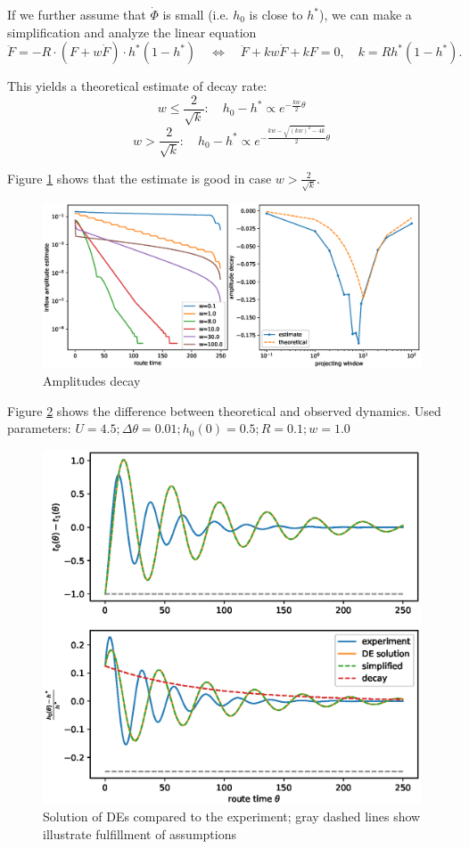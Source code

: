 \documentclass[12pt]{article}
\begin{document}
If we further assume that $\dot{\Phi}$ is small (i.e. $h_0$ is close to $h^*$), we can make a simplification and analyze the linear equation
$$ \ddot{F} = - R \cdot(F + w \dot{F}) \cdot  h^*(1-h^*) \quad \Leftrightarrow \quad \ddot{F} + kw\dot{F} + kF = 0 , \quad k = Rh^*(1-h^*).$$

This yields a theoretical estimate of decay rate:
$$ w \leq \frac{2}{\sqrt{k}}: \quad h_0 - h^* \propto e^{-\frac{kw}{2} \theta}$$ 
$$w > \frac{2}{\sqrt{k}}: \quad h_0 - h^* \propto e^{-\frac{kw - \sqrt{(kw)^2 - 4k}}{2}\theta}$$

Figure \ref{fig:amplitudes_decay} shows that the estimate is good in case $w > \frac{2}{\sqrt{k}}$.

\begin{figure}
	\includegraphics[scale=0.5]{img/amplitudes_decay.eps}
	\caption{Amplitudes decay }
	\label{fig:amplitudes_decay}

\end{figure}	

Figure \ref{fig:de_comparison} shows the difference between theoretical and observed dynamics. Used parameters: $ U = 4.5; \Delta\theta = 0.01;  h_0(0) = 0.5;  R = 0.1; w = 1.0 $

\begin{figure}
	\includegraphics[scale=0.75]{img/de_comparison.eps}
	\caption{Solution of DEs compared to the experiment; gray dashed lines show illustrate fulfillment of assumptions }
	\label{fig:de_comparison}

\end{figure}	
\end{document}
